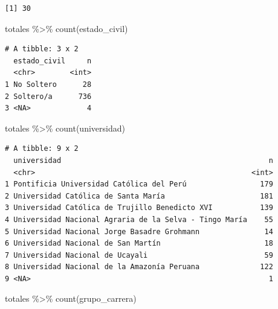 \documentclass[
  letterpaper,
  DIV=11,
  numbers=noendperiod]{scrartcl}
\newenvironment{Shaded}{\begin{snugshade}}{\end{snugshade}}
\newcommand{\FunctionTok}[1]{\textcolor[rgb]{0.28,0.35,0.67}{#1}}
\newcommand{\NormalTok}[1]{\textcolor[rgb]{0.00,0.23,0.31}{#1}}
\newcommand{\SpecialCharTok}[1]{\textcolor[rgb]{0.37,0.37,0.37}{#1}}
\begin{document}
\begin{Shaded}
\end{Shaded}

\begin{verbatim}
[1] 30
\end{verbatim}

\begin{Shaded}
\begin{Highlighting}[]
\NormalTok{totales }\SpecialCharTok{\%\textgreater{}\%} \FunctionTok{count}\NormalTok{(estado\_civil)}
\end{Highlighting}
\end{Shaded}

\begin{verbatim}
# A tibble: 3 x 2
  estado_civil     n
  <chr>        <int>
1 No Soltero      28
2 Soltero/a      736
3 <NA>             4
\end{verbatim}

\begin{Shaded}
\begin{Highlighting}[]
\NormalTok{totales }\SpecialCharTok{\%\textgreater{}\%} \FunctionTok{count}\NormalTok{(universidad)}
\end{Highlighting}
\end{Shaded}

\begin{verbatim}
# A tibble: 9 x 2
  universidad                                                n
  <chr>                                                  <int>
1 Pontificia Universidad Católica del Perú                 179
2 Universidad Católica de Santa María                      181
3 Universidad Católica de Trujillo Benedicto XVI           139
4 Universidad Nacional Agraria de la Selva - Tingo María    55
5 Universidad Nacional Jorge Basadre Grohmann               14
6 Universidad Nacional de San Martín                        18
7 Universidad Nacional de Ucayali                           59
8 Universidad Nacional de la Amazonía Peruana              122
9 <NA>                                                       1
\end{verbatim}

\begin{Shaded}
\begin{Highlighting}[]
\NormalTok{totales }\SpecialCharTok{\%\textgreater{}\%} \FunctionTok{count}\NormalTok{(grupo\_carrera)}
\end{Highlighting}
\end{Shaded}
\end{document}
